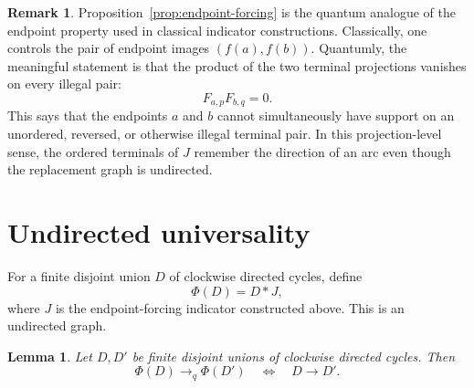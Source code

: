 \documentclass[11pt]{amsart}
\theoremstyle{plain}
\newtheorem{lemma}[theorem]{Lemma}
\theoremstyle{definition}
\newtheorem{remark}[theorem]{Remark}
\newcommand{\toq}{\to_q}
\begin{document}
\begin{remark}\label{rem:quantum-indicator-method}
Proposition~\ref{prop:endpoint-forcing} is the quantum analogue of the endpoint property used in classical indicator constructions.  Classically, one controls the pair of endpoint images $(f(a),f(b))$.  Quantumly, the meaningful statement is that the product of the two terminal projections vanishes on every illegal pair:
\[
   F_{a,p}F_{b,q}=0.
\]
This says that the endpoints $a$ and $b$ cannot simultaneously have support on an unordered, reversed, or otherwise illegal terminal pair.  In this projection-level sense, the ordered terminals of $J$ remember the direction of an arc even though the replacement graph is undirected.
\end{remark}

\section{Undirected universality}

For a finite disjoint union $D$ of clockwise directed cycles, define
\[
   \Phi(D)=D*J,
\]
where $J$ is the endpoint-forcing indicator constructed above.  This is an undirected graph.

\begin{lemma}\label{lem:indicator-reflects}
Let $D,D'$ be finite disjoint unions of clockwise directed cycles.  Then
\[
   \Phi(D)\toq \Phi(D')
   \quad\Longleftrightarrow\quad
   D\to D'.
\]
\end{lemma}
\end{document}
